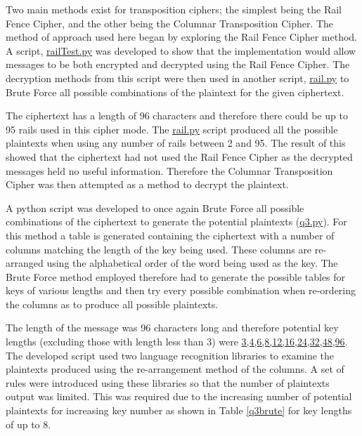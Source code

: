 \documentclass[a4paper,11pt]{article}
\begin{document}
	Two main methods exist for transposition ciphers; the simplest being the Rail Fence Cipher, and the other being the Columnar Transposition Cipher. The method of approach used here began by exploring the Rail Fence Cipher method. A script, \url{railTest.py} was developed to show that the implementation would allow messages to be both encrypted and decrypted using the Rail Fence Cipher. The decryption methods from this script were then used in another script, \url{rail.py} to Brute Force all possible combinations of the plaintext for the given ciphertext.
	
	The ciphertext has a length of 96 characters and therefore there could be up to 95 rails used in this cipher mode. The \url{rail.py} script produced all the possible plaintexts when using any number of rails between 2 and 95. The result of this showed that the ciphertext had not used the Rail Fence Cipher as the decrypted messages held no useful information. Therefore the Columnar Transposition Cipher was then attempted as a method to decrypt the plaintext.
	
	A python script was developed to once again Brute Force all possible combinations of the ciphertext to generate the potential plaintexts (\url{q3.py}). For this method a table is generated containing the ciphertext with a number of columns matching the length of the key being used. These columns are re-arranged using the alphabetical order of the word being used as the key. The Brute Force method employed therefore had to generate the possible tables for keys of various lengths and then try every possible combination when re-ordering the columns as to produce all possible plaintexts.
	
	The length of the message was 96 characters long and therefore potential key lengths (excluding those with length less than 3) were \url{3,4,6,8,12,16,24,32,48,96}. The developed script used two language recognition libraries to examine the plaintexts produced using the re-arrangement method of the columns. A set of rules were introduced using these libraries so that the number of plaintexts output was limited. This was required due to the increasing number of potential plaintexts for increasing key number as shown in Table \ref{q3brute} for key lengths of up to 8.
			
\end{document}

